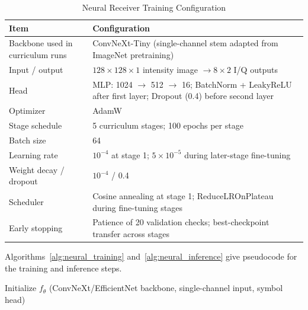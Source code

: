 \documentclass[journal]{IEEEtran}
\begin{document}
\begin{table}[!t]
\centering
\caption{Neural Receiver Training Configuration}
\label{tab:neural_hparams}
\small
\renewcommand{\arraystretch}{1.1}
\begin{tabularx}{\columnwidth}{l X}
\toprule
\textbf{Item} & \textbf{Configuration} \\
\midrule
Backbone used in curriculum runs & ConvNeXt-Tiny (single-channel stem adapted from ImageNet pretraining) \\
Input / output & $128 \times 128 \times 1$ intensity image $\rightarrow 8 \times 2$ I/Q outputs \\
Head & MLP: 1024 $\rightarrow$ 512 $\rightarrow$ 16; BatchNorm + LeakyReLU after first layer; Dropout (0.4) before second layer \\
Optimizer & AdamW~\cite{loshchilov2019decoupled} \\
Stage schedule & 5 curriculum stages; 100 epochs per stage \\
Batch size & 64 \\
Learning rate & $10^{-4}$ at stage 1; $5 \times 10^{-5}$ during later-stage fine-tuning \\
Weight decay / dropout & $10^{-4}$ / 0.4 \\
Scheduler & Cosine annealing at stage 1; ReduceLROnPlateau during fine-tuning stages \\
Early stopping & Patience of 20 validation checks; best-checkpoint transfer across stages \\
\bottomrule
\end{tabularx}
\end{table}

Algorithms~\ref{alg:neural_training} and~\ref{alg:neural_inference} give pseudocode for the training and inference steps.

\begin{algorithm}[!t]
\caption{Neural Receiver Training}
\label{alg:neural_training}
Initialize $f_\theta$ (ConvNeXt/EfficientNet backbone, single-channel input, symbol head)\;
\end{algorithm}
\end{document}
